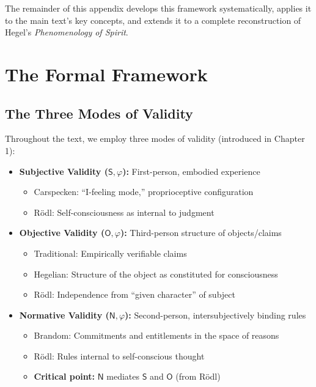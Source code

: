 \documentclass[12pt]{book}
\begin{document}
The remainder of this appendix develops this framework systematically, applies it to the main text's key concepts, and extends it to a complete reconstruction of Hegel's \emph{Phenomenology of Spirit}.

\section{The Formal Framework}

\subsection{The Three Modes of Validity}

Throughout the text, we employ three modes of validity (introduced in Chapter 1):

\begin{itemize}
    \item \textbf{Subjective Validity ($\mathsf{S},\varphi$):} First-person, embodied experience
    \begin{itemize}
        \item Carspecken: ``I-feeling mode,'' proprioceptive configuration
        \item Rödl: Self-consciousness as internal to judgment
    \end{itemize}
    
    \item \textbf{Objective Validity ($\mathsf{O},\varphi$):} Third-person structure of objects/claims
    \begin{itemize}
        \item Traditional: Empirically verifiable claims
        \item Hegelian: Structure of the object as constituted for consciousness
        \item Rödl: Independence from ``given character'' of subject
    \end{itemize}
    
    \item \textbf{Normative Validity ($\mathsf{N},\varphi$):} Second-person, intersubjectively binding rules
    \begin{itemize}
        \item Brandom: Commitments and entitlements in the space of reasons
        \item Rödl: Rules internal to self-conscious thought
        \item \textbf{Critical point:} $\mathsf{N}$ mediates $\mathsf{S}$ and $\mathsf{O}$ (from Rödl)
    \end{itemize}
\end{itemize}
\end{document}
